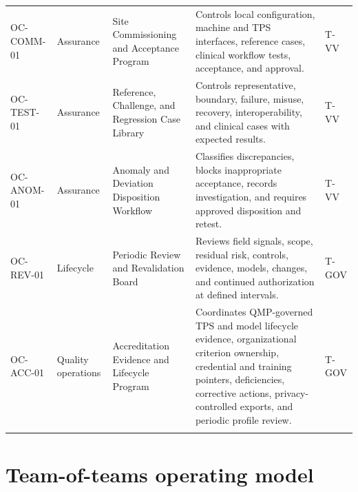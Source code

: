 \documentclass[11pt,letterpaper]{article}
\begin{document}
\begin{scriptsize}
\begin{longtable}{@{}L{0.15\textwidth}L{0.11\textwidth}L{0.21\textwidth}L{0.38\textwidth}L{0.08\textwidth}@{}}
\addlinespace[2pt]
\mbox{OC-COMM-01} & Assurance & Site Commissioning and Acceptance Program & Controls local configuration, machine and TPS interfaces, reference cases, clinical workflow tests, acceptance, and approval. & T-VV \\
\addlinespace[2pt]
\mbox{OC-TEST-01} & Assurance & Reference, Challenge, and Regression Case Library & Controls representative, boundary, failure, misuse, recovery, interoperability, and clinical cases with expected results. & T-VV \\
\addlinespace[2pt]
\mbox{OC-ANOM-01} & Assurance & Anomaly and Deviation Disposition Workflow & Classifies discrepancies, blocks inappropriate acceptance, records investigation, and requires approved disposition and retest. & T-VV \\
\addlinespace[2pt]
\mbox{OC-REV-01} & Lifecycle & Periodic Review and Revalidation Board & Reviews field signals, scope, residual risk, controls, evidence, models, changes, and continued authorization at defined intervals. & T-GOV \\
\addlinespace[2pt]
\mbox{OC-ACC-01} & Quality operations & Accreditation Evidence and Lifecycle Program & Coordinates QMP-governed TPS and model lifecycle evidence, organizational criterion ownership, credential and training pointers, deficiencies, corrective actions, privacy-controlled exports, and periodic profile review. & T-GOV \\
\addlinespace[2pt]
\end{longtable}
\end{scriptsize}

\section{Team-of-teams operating model}
\end{document}

